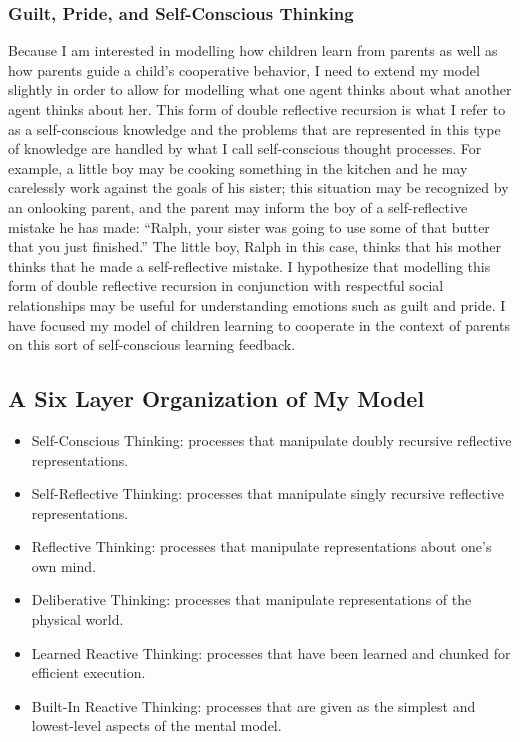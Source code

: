 \subsubsection{Guilt, Pride, and Self-Conscious Thinking}

Because I am interested in modelling how children learn from parents
as well as how parents guide a child's cooperative behavior, I need
to extend my model slightly in order to allow for modelling what one
agent thinks about what another agent thinks about her. This form of
double reflective recursion is what I refer to as a self-conscious
knowledge and the problems that are represented in this type of
knowledge are handled by what I call self-conscious thought
processes. For example, a little boy may be cooking something in the
kitchen and he may carelessly work against the goals of his sister;
this situation may be recognized by an onlooking parent, and the
parent may inform the boy of a self-reflective mistake he has made:
``Ralph, your sister was going to use some of that butter that you just
finished.'' The little boy, Ralph in this case, thinks that his mother
thinks that he made a self-reflective mistake. I hypothesize that
modelling this form of double reflective recursion in conjunction with
respectful social relationships may be useful for understanding
emotions such as guilt and pride. I have focused my model of
children learning to cooperate in the context of parents on this sort
of self-conscious learning feedback.

\subsection{A Six Layer Organization of My Model}

\begin{itemize}
\item{Self-Conscious Thinking: processes that manipulate doubly recursive reflective representations.}
\item{Self-Reflective Thinking: processes that manipulate singly recursive reflective representations.}
\item{Reflective Thinking: processes that manipulate representations about one's own mind.}
\item{Deliberative Thinking: processes that manipulate representations of the physical world.}
\item{Learned Reactive Thinking: processes that have been learned and chunked for efficient execution.}
\item{Built-In Reactive Thinking: processes that are given as the simplest and lowest-level aspects of the mental model.}
\end{itemize}

